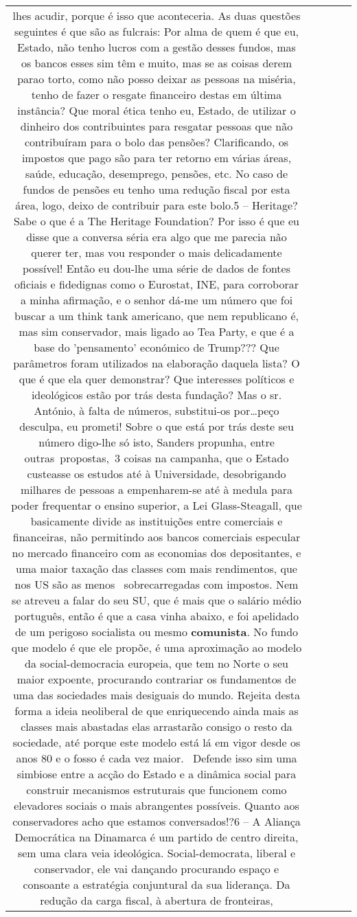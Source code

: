 \documentclass[11pt]{article}
\newlength\mylength
\begin{document}
\begin{center}
\begin{longtable}{|C{.65\mylength}|C{.30\mylength}|C{.12\mylength}|C{.12\mylength}|C{.12\mylength}|}
lhes acudir, porque é isso que aconteceria. As duas questões seguintes é que são as fulcrais: Por alma de quem é que eu, Estado, não tenho lucros com a gestão desses fundos, mas os bancos esses sim têm e muito, mas se as coisas derem parao torto, como não posso deixar as pessoas na miséria, tenho de fazer o resgate financeiro destas em última instância? Que moral ética tenho eu, Estado, de utilizar o dinheiro dos contribuintes para resgatar pessoas que não contribuíram para o bolo das pensões? Clarificando, os impostos que pago são para ter retorno em várias áreas, saúde, educação, desemprego, pensões, etc. No caso de fundos de pensões eu tenho uma redução fiscal por esta área, logo, deixo de contribuir para este bolo.5 – Heritage? Sabe o que é a The Heritage Foundation? Por isso é que eu disse que a conversa séria era algo que me parecia não querer ter, mas vou responder o mais delicadamente possível! Então eu dou-lhe uma série de dados de fontes oficiais e fidedignas como o Eurostat, INE, para corroborar a minha afirmação, e o senhor dá-me um número que foi buscar a um think tank americano, que nem republicano é, mas sim conservador, mais ligado ao Tea Party, e que é a base do 'pensamento' económico de Trump??? Que parâmetros foram utilizados na elaboração daquela lista? O que é que ela quer demonstrar? Que interesses políticos e ideológicos estão por trás desta fundação? Mas o sr. António, à falta de números, substitui-os por…peço desculpa, eu prometi! Sobre o que está por trás deste seu número digo-lhe só isto, Sanders propunha, entre outras propostas, 3 coisas na campanha, que o Estado custeasse os estudos até à Universidade, desobrigando milhares de pessoas a empenharem-se até à medula para poder frequentar o ensino superior, a Lei Glass-Steagall, que basicamente divide as instituições entre comerciais e financeiras, não permitindo aos bancos comerciais especular no mercado financeiro com as economias dos depositantes, e uma maior taxação das classes com mais rendimentos, que nos US são as menos  sobrecarregadas com impostos. Nem se atreveu a falar do seu SU, que é mais que o salário médio português, então é que a casa vinha abaixo, e foi apelidado de um perigoso socialista ou mesmo \textbf{comunista}. No fundo que modelo é que ele propõe, é uma aproximação ao modelo da social-democracia europeia, que tem no Norte o seu maior expoente, procurando contrariar os fundamentos de uma das sociedades mais desiguais do mundo. Rejeita desta forma a ideia neoliberal de que enriquecendo ainda mais as classes mais abastadas elas arrastarão consigo o resto da sociedade, até porque este modelo está lá em vigor desde os anos 80 e o fosso é cada vez maior.  Defende isso sim uma simbiose entre a acção do Estado e a dinâmica social para construir mecanismos estruturais que funcionem como elevadores sociais o mais abrangentes possíveis. Quanto aos conservadores acho que estamos conversados!?6 – A Aliança Democrática na Dinamarca é um partido de centro direita, sem uma clara veia ideológica. Social-democrata, liberal e conservador, ele vai dançando procurando espaço e consoante a estratégia conjuntural da sua liderança. Da redução da carga fiscal, à abertura de fronteiras, 
\end{longtable}
\end{center}
\end{document}
